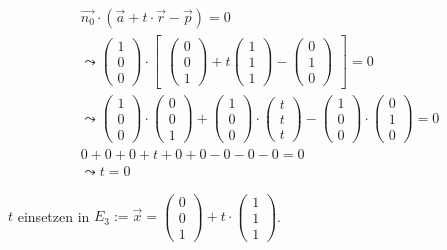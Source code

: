 \begin{gather}
\vec{n_0} \cdot (\vec{a}+t\cdot \vec{r}-\vec{p})=0\\
\leadsto 
\begin{pmatrix}
1\\0\\0
\end{pmatrix} \cdot 
\begin{bmatrix}
\begin{pmatrix}
0\\0\\1
\end{pmatrix}
+ t
\begin{pmatrix}
1\\1\\1
\end{pmatrix}
-
\begin{pmatrix}
0\\1\\0
\end{pmatrix}
\end{bmatrix} = 0\\
\leadsto
\begin{pmatrix}
1\\0\\0
\end{pmatrix}\cdot
\begin{pmatrix}
0\\0\\1
\end{pmatrix}
+
\begin{pmatrix}
1\\0\\0
\end{pmatrix}
\cdot
\begin{pmatrix}
t\\t\\t
\end{pmatrix}
-
\begin{pmatrix}
1\\0\\0
\end{pmatrix}
\cdot
\begin{pmatrix}
0\\1\\0
\end{pmatrix} =0\\
0+0+0+t+0+0-0-0-0=0\\
\leadsto t=0
\end{gather}

\ensuremath{t} einsetzen in \ensuremath{E_3:= \vec{x}=\begin{pmatrix}
		0\\0\\1
	\end{pmatrix} +t\cdot\begin{pmatrix}
		1\\1\\1
\end{pmatrix}}.\\


